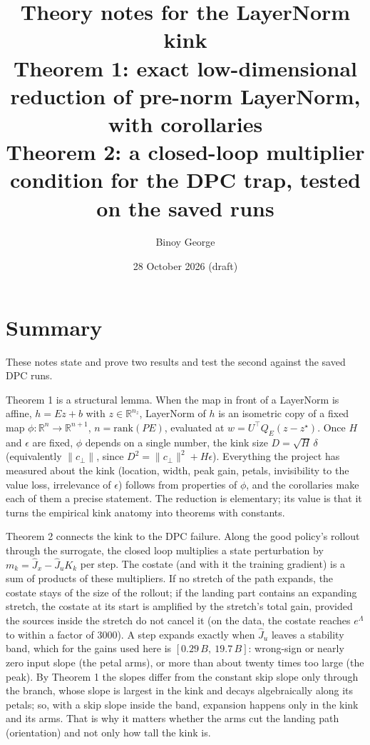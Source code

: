 \documentclass[11pt]{article}
\title{Theory notes for the LayerNorm kink\\[0.3em]
\large Theorem 1: exact low-dimensional reduction of pre-norm LayerNorm, with corollaries\\
Theorem 2: a closed-loop multiplier condition for the DPC trap, tested on the saved runs}
\author{Binoy George}
\date{28 October 2026 (draft)}
\theoremstyle{plainnote}
\newcommand{\R}{\mathbb R}
\newcommand{\cp}{c_\perp}
\newcommand{\Jx}{\hat J_x}
\newcommand{\Ju}{\hat J_u}
\begin{document}
\maketitle
\tableofcontents
\newpage

\section{Summary}\label{sec:summary}

These notes state and prove two results and test the second against the saved DPC runs.

Theorem 1 is a structural lemma. When the map in front of a LayerNorm is affine, $h=Ez+b$ with $z\in\R^{n_z}$, LayerNorm of $h$ is an isometric copy of a fixed map $\phi:\R^n\to\R^{n+1}$, $n=\mathrm{rank}(PE)$, evaluated at $w=U^\top Q_E(z-z^\star)$. Once $H$ and $\epsilon$ are fixed, $\phi$ depends on a single number, the kink size $D=\sqrt H\,\delta$ (equivalently $\|\cp\|$, since $D^2=\|\cp\|^2+H\epsilon$). Everything the project has measured about the kink (location, width, peak gain, petals, invisibility to the value loss, irrelevance of $\epsilon$) follows from properties of $\phi$, and the corollaries make each of them a precise statement. The reduction is elementary; its value is that it turns the empirical kink anatomy into theorems with constants.

Theorem 2 connects the kink to the DPC failure. Along the good policy's rollout through the surrogate, the closed loop multiplies a state perturbation by $m_k=\Jx-\Ju K_k$ per step. The costate (and with it the training gradient) is a sum of products of these multipliers. If no stretch of the path expands, the costate stays of the size of the rollout; if the landing part contains an expanding stretch, the costate at its start is amplified by the stretch's total gain, provided the sources inside the stretch do not cancel it (on the data, the costate reaches $e^{\Lambda}$ to within a factor of 3000). A step expands exactly when $\Ju$ leaves a stability band, which for the gains used here is $[0.29\,B,\ 19.7\,B]$: wrong-sign or nearly zero input slope (the petal arms), or more than about twenty times too large (the peak). By Theorem 1 the slopes differ from the constant skip slope only through the branch, whose slope is largest in the kink and decays algebraically along its petals; so, with a skip slope inside the band, expansion happens only in the kink and its arms. That is why it matters whether the arms cut the landing path (orientation) and not only how tall the kink is.
\end{document}
